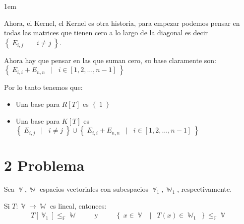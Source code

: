 \documentclass[12pt, fleqn]{article}                             %
\newenvironment{SmallIndentation}[1][0.75em]                    %
        {\begin{adjustwidth}{#1}{}\begin{footnotesize}}             %
        {\end{footnotesize}\end{adjustwidth}}                       %
\DeclareMathOperator \Space {\quad}                             %
\DeclareMathOperator \MiniSpace {\;}                            %
\newcommand \Such {\MiniSpace | \MiniSpace}                     %
\newcommand \Also {\MiniSpace \text{y} \MiniSpace}              %
\theoremstyle{break}                                            %
\DeclareMathOperator \GenericField {\mathbb{F}}                 %
\DeclareMathOperator \VectorSet    {\mathbb{V}}                 %
\DeclareMathOperator \SubVectorSet {\mathbb{W}}                 %
\newcommand{\Set}[1]    {\left\{ \; #1 \; \right\}}             %
\begin{document}
\begin{itemize}
\begin{SmallIndentation}[1em]
                    Ahora, el Kernel, el Kernel es otra historia, para empezar podemos
                    pensar en todas las matrices que tienen cero a lo largo de la diagonal
                    es decir $\Set{E_{i, j} \Such i \neq j}$.

                    Ahora hay que pensar en las que suman cero, su base claramente son:
                    $\Set{E_{i, i} + E_{n, n} \Such i \in [1, 2, \dots, n - 1]}$

                    Por lo tanto tenemos que:
                    \begin{itemize}
                        \item Una base para $R[T]$ es $\Set{1}$
                        \item Una base para $K[T]$ es $\Set{E_{i, j} \Such i \neq j} \cup 
                            \Set{E_{i, i} + E_{n, n} \Such i \in [1, 2, \dots, n - 1]}$
                    \end{itemize}
                
                \end{SmallIndentation}

        \end{itemize}



\clearpage
\section{2 Problema}

    Sea $\VectorSet, \SubVectorSet$ espacios vectoriales con subespacios 
    $\VectorSet_1, \SubVectorSet_1$, respectivamente. 

    Si $T : \VectorSet \to \SubVectorSet$ es lineal, entonces:
    \begin{align*}
        T[\VectorSet_1] \leq_{\GenericField} \SubVectorSet
        \Space \Also \Space     
        \Set{x \in \VectorSet \Such T(x) \in \SubVectorSet_1} \leq_{\GenericField} \VectorSet   
    \end{align*} 
\end{document}
